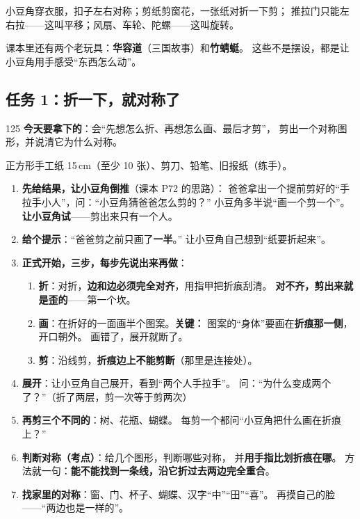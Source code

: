 小豆角穿衣服，扣子左右对称；剪纸剪窗花，一张纸对折一下剪；
推拉门只能左右拉——这叫平移；风扇、车轮、陀螺——这叫旋转。

课本里还有两个老玩具：\textbf{华容道}（三国故事）和\textbf{竹蜻蜓}。
这些不是摆设，都是让小豆角用手感受“东西怎么动”。

\subsection{任务 1：折一下，就对称了}

\begin{lesson}{1}{25}
\textbf{今天要拿下的}：会“先想怎么折、再想怎么画、最后才剪”，
剪出一个对称图形，并说清它为什么对称。

\begin{materials}
正方形手工纸 15\,cm（至少 10 张）、剪刀、铅笔、旧报纸（练手）。
\end{materials}

\begin{enumerate}
  \item \textbf{先给结果，让小豆角倒推}（课本 P72 的思路）：
        爸爸拿出一个提前剪好的“手拉手小人”，问：“小豆角猜爸爸怎么剪的？”
        小豆角多半说“画一个剪一个”。\textbf{让小豆角试}——剪出来只有一个人。
  \item \textbf{给个提示}：“爸爸剪之前只画了\textbf{一半}。”
        让小豆角自己想到“纸要折起来”。
  \item \textbf{正式开始，三步，每步先说出来再做}：
        \begin{enumerate}[label=第\arabic*步：]
          \item \textbf{折}：对折，\textbf{边和边必须完全对齐}，用指甲把折痕刮清。
                \textbf{对不齐，剪出来就是歪的}——第一个坎。
          \item \textbf{画}：在折好的一面画半个图案。\textbf{关键：}
                图案的“身体”要画在\textbf{折痕那一侧}，开口朝外。
                画错了，展开就断了。
          \item \textbf{剪}：沿线剪，\textbf{折痕边上不能剪断}（那里是连接处）。
        \end{enumerate}
  \item \textbf{展开}：让小豆角自己展开，看到“两个人手拉手”。
        问：“为什么变成两个了？”（折了两层，剪一次等于剪两次）
  \item \textbf{再剪三个不同的}：树、花瓶、蝴蝶。
        每剪一个都问“小豆角把什么画在折痕上？”
  \item \textbf{判断对称（考点）}：给几个图形，判断哪些对称，
        并\textbf{用手指比划折痕在哪}。
        方法就一句：\textbf{能不能找到一条线，沿它折过去两边完全重合}。
  \item \textbf{找家里的对称}：窗、门、杯子、蝴蝶、汉字“中”“田”“喜”。
        再摸自己的脸——“两边也是一样的”。
\end{enumerate}


\end{lesson}
